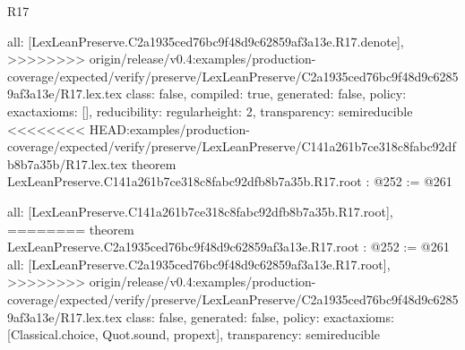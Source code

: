\begin{lexlean}{R17}
\begin{coremodule}
{{{{{  all: [LexLeanPreserve.C2a1935ced76bc9f48d9c62859af3a13e.R17.denote],
>>>>>>>> origin/release/v0.4:examples/production-coverage/expected/verify/preserve/LexLeanPreserve/C2a1935ced76bc9f48d9c62859af3a13e/R17.lex.tex
  class: false,
  compiled: true,
  generated: false,
  policy: exact{axioms: []},
  reducibility: regular{height: 2},
  transparency: semireducible
}
<<<<<<<< HEAD:examples/production-coverage/expected/verify/preserve/LexLeanPreserve/C141a261b7ce318c8fabc92dfb8b7a35b/R17.lex.tex
theorem LexLeanPreserve.C141a261b7ce318c8fabc92dfb8b7a35b.R17.root : @252 := @261 {
  all: [LexLeanPreserve.C141a261b7ce318c8fabc92dfb8b7a35b.R17.root],
========
theorem LexLeanPreserve.C2a1935ced76bc9f48d9c62859af3a13e.R17.root : @252 := @261 {
  all: [LexLeanPreserve.C2a1935ced76bc9f48d9c62859af3a13e.R17.root],
>>>>>>>> origin/release/v0.4:examples/production-coverage/expected/verify/preserve/LexLeanPreserve/C2a1935ced76bc9f48d9c62859af3a13e/R17.lex.tex
  class: false,
  generated: false,
  policy: exact{axioms: [Classical.choice, Quot.sound, propext]},
  transparency: semireducible
}

}}}}}
\end{coremodule}
\end{lexlean}
